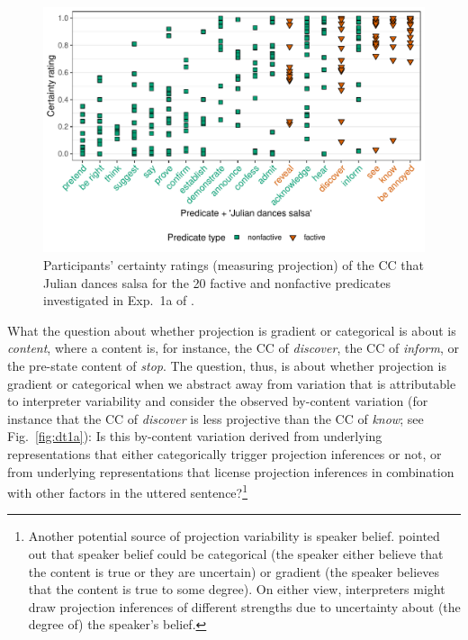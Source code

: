 \documentclass[11pt,fleqn]{article}
\newcommand{\6}{\mbox{$[\hspace*{-.6mm}[$}}
\newcommand{\9}{\mbox{$]\hspace*{-.6mm}]$}}
\begin{document}
\begin{figure}[h!]
\centering
\includegraphics[width=.8\textwidth]{../../results/main/13explicitIgnorance/graphs/mean-certainty-by-predicateType-JULIAN}
\caption{Participants' certainty ratings (measuring projection) of the CC that Julian dances salsa for the 20 \color{orange}factive \color{black} and \color{green}nonfactive \color{black} predicates investigated in Exp.~1a of \citealt{degen-tonhauser-language}.}\label{fig:dt1a-JULIAN}
\end{figure}

What the question about whether projection is gradient or categorical is about is {\em content}, where a content is, for instance, the CC of {\em discover}, the CC of {\em inform}, or the pre-state content of {\em stop}. The question, thus, is about whether projection is gradient or categorical when we abstract away from variation that is attributable to interpreter variability and consider the observed by-content variation (for instance that the CC of {\em discover} is less projective than the CC of {\em know}; see Fig.~\ref{fig:dt1a}): Is this by-content variation derived from underlying representations that either categorically trigger projection inferences or not, or from underlying representations that license projection inferences in combination with other factors in the uttered sentence?\footnote{Another potential source of projection variability is speaker belief. \citealt[498f.]{tbd-variability} pointed out that speaker belief could be categorical (the speaker either believe that the content is true or they are uncertain) or gradient (the speaker believes that the content is true to some degree). On either view, interpreters might draw projection inferences of different strengths due to uncertainty about (the degree of) the speaker's belief.} 
\end{document}

